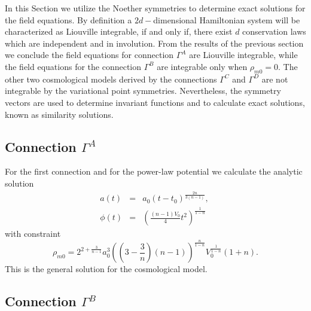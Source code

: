 \documentclass[onecolumn,superscriptaddress,secnumarabic,nobibnotes,aps,prd,nofootinbib,altaffilletter,11pt]{revtex4}
\begin{document}
\label{sec5}

In this Section we utilize the Noether symmetries to determine exact
solutions for the field equations. By definition a $2d-$dimensional
Hamiltonian system will be characterized as Liouville integrable, if and
only if, there exist $d$ conservation laws which are independent and in
involution. From the results of the previous section we conclude the field
equations for connection $\Gamma ^{A}$ are Liouville integrable, while the
field equations for the connection $\Gamma ^{B}$ are integrable only when $%
\rho _{m0}=0$. The other two cosmological models derived by the connections $%
\Gamma ^{C}$ and $\Gamma ^{D}$ are not integrable by the variational point
symmetries. Nevertheless, the symmetry vectors are used to determine
invariant functions and to calculate exact solutions, known as similarity
solutions.

\subsection{Connection $\Gamma ^{A}$}

For the first connection and for the power-law potential we calculate the
analytic solution 
\begin{eqnarray}
a\left( t\right) &=&a_{0}\left( t-t_{0}\right) ^{\frac{2n}{3\left(
n-1\right) }},~ \\
\phi \left( t\right) &=&\left( \frac{\left( n-1\right) V_{0}}{4}t^{2}\right)
^{\frac{1}{1-n}}
\end{eqnarray}%
with constraint 
\begin{equation}
\rho _{m0}=2^{2+\frac{3}{n-1}}a_{0}^{3}\left( \left( 3-\frac{3}{n}\right)
\left( n-1\right) \right) ^{\frac{n}{1-n}}V_{0}^{\frac{1}{1-n}}\left(
1+n\right) .
\end{equation}%
This is the general solution for the cosmological model.

\subsection{Connection $\Gamma ^{B}$}
\end{document}
